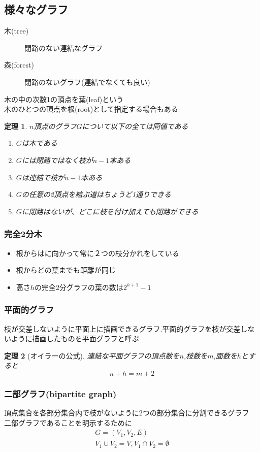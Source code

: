 \documentclass[a4j,10.5pt]{jarticle}
\newtheorem{theo}{定理}[section]
\begin{document}
\subsection{様々なグラフ}
\begin{description}
\item[木(tree)] 閉路のない連結なグラフ
\item[森(forest)] 閉路のないグラフ(連結でなくても良い)
\end{description}
木の中の次数1の頂点を葉(leaf)という\\
木のひとつの頂点を根(root)として指定する場合もある

\begin{theo}
$n$頂点のグラフ$G$について以下の全ては同値である
\begin{enumerate}
\item $G$は木である
\item $G$には閉路ではなく枝が$n-1$本ある
\item $G$は連結で枝が$n-1$本ある
\item $G$の任意の2頂点を結ぶ道はちょうど1通りできる
\item $G$に閉路はないが、どこに枝を付け加えても閉路ができる
\end{enumerate}
\end{theo}

\subsubsection*{完全2分木}
\begin{itemize}
\item 根からはに向かって常に２つの枝分かれをしている
\item 根からどの葉までも距離が同じ
\item 高さ$h$の完全2分グラフの葉の数は$2^{h + 1} - 1$
\end{itemize}

\subsubsection*{平面的グラフ}
枝が交差しないように平面上に描画できるグラフ.平面的グラフを枝が交差しないように描画したものを平面グラフと呼ぶ

\begin{theo}[オイラーの公式]
連結な平面グラフの頂点数を$n$,枝数を$m$,面数を$h$とすると
\[n + h = m + 2\]
\end{theo}

\subsubsection*{二部グラフ(bipartite graph)}
頂点集合を各部分集合内で枝がないように2つの部分集合に分割できるグラフ\\
二部グラフであることを明示するために
\begin{eqnarray*}
G = (V_1,V_2,E)\\
V_1 \cup V_2 = V, V_1 \cap V_2 = \emptyset
\end{eqnarray*}
\end{document}
